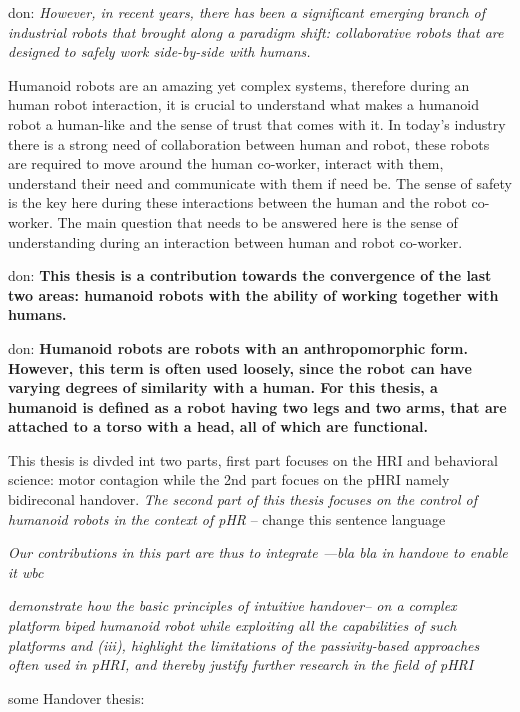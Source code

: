 \documentclass[a4paper, 11pt, oneside]{Thesis}
\begin{document}
don: \textit{However, in recent years, there has been a significant emerging branch
of industrial robots that brought along a paradigm shift: collaborative robots that
are designed to safely work side-by-side with humans. }

Humanoid robots are an amazing yet complex systems, therefore during an human robot interaction, it is crucial to understand what makes a humanoid robot a human-like and the sense of trust that comes with it. In today's industry there is a strong need of collaboration between human and robot, these robots are required to move around the human co-worker, interact with them, understand their need and communicate with them if need be. The sense of safety is the key here during these interactions between the human and the robot co-worker. The main question that needs to be answered here is the sense of understanding during an interaction between human and robot co-worker.

don: \textbf{This thesis is a contribution towards the convergence of the last two areas: humanoid robots with the ability of working together with humans.}

don: \textbf{Humanoid robots are robots with an anthropomorphic form. However, this term is often used loosely, since the robot can have varying degrees of similarity with a
human. For this thesis, a humanoid is defined as a robot having two legs and two arms, that are attached to a torso with a head, all of which are functional.}

This thesis is divded int two parts, first part focuses on the HRI and behavioral science: motor contagion while the 2nd part focues on the pHRI namely bidireconal handover.
\textit{The second part of this thesis focuses on the control of humanoid robots in the context of pHR} -- change this sentence language

\textit{Our contributions in this part are thus to integrate  ---bla bla in handove to enable it wbc}

\textit{ demonstrate how the basic principles of intuitive handover-- on a complex platform biped humanoid robot while exploiting all the capabilities of such platforms and (iii), highlight the limitations of the passivity-based approaches often used in pHRI, and thereby justify further research in the field of pHRI}


some Handover thesis: 
\end{document}
